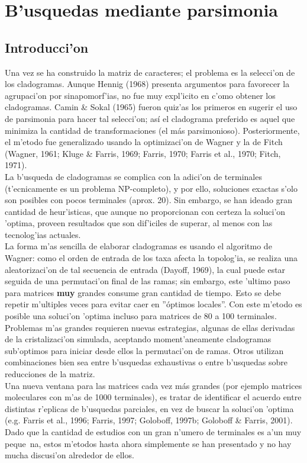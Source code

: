 \chapter{B'usquedas mediante parsimonia}
\section*{Introducci'on}
Una vez se ha construido la matriz de caracteres; el  problema es la selecci'on de los cladogramas. Aunque Hennig (1968) presenta argumentos para favorecer la agrupaci'on por sinapomorf'ias, no fue muy expl'icito en c'omo obtener los cladogramas. Camin \& Sokal (1965) fueron quiz'as los primeros en sugerir el uso de parsimonia para hacer tal selecci'on; as\'i el cladograma preferido es aquel que minimiza la cantidad de transformaciones (el m\'as parsimonioso). Posteriormente, el m'etodo fue generalizado usando la optimizaci'on de Wagner y la de Fitch (Wagner, 1961; Kluge \& Farris, 1969; Farris, 1970; Farris et al., 1970; Fitch, 1971).\\
La b'usqueda de cladogramas se complica con la adici'on de terminales (t'ecnicamente es un problema NP-completo), y por ello, soluciones exactas s'olo son posibles con pocos terminales (aprox. 20). Sin embargo, se han ideado gran cantidad de heur'isticas, que aunque no proporcionan con certeza la soluci'on 'optima, proveen resultados que son dif'iciles de superar, al menos con las tecnolog'ias actuales.\\
La forma m'as sencilla de elaborar cladogramas es usando el algoritmo de Wagner: como el orden de entrada de los taxa afecta la topolog'ia, se realiza una aleatorizaci'on de tal secuencia de entrada (Dayoff, 1969), la cual puede estar seguida de una permutaci'on final de las ramas; sin embargo, este 'ultimo paso para matrices \textbf{muy} grandes consume gran cantidad de tiempo. Esto se debe repetir m'ultiples veces para evitar caer en ''\'optimos locales''. Con este m'etodo es posible una soluci'on 'optima incluso para matrices de 80 a 100 terminales. Problemas m'as grandes requieren nuevas estrategias, algunas de ellas derivadas de la cristalizaci'on simulada, aceptando moment'aneamente cladogramas sub'optimos para iniciar desde ellos la permutaci'on de ramas. Otros utilizan combinaciones bien sea entre b'usquedas exhaustivas o entre b'usquedas sobre reducciones de la matriz.\\
Una nueva ventana para las matrices cada vez m\'as grandes (por ejemplo matrices moleculares con m'as de 1000 terminales), es tratar de identificar el acuerdo entre distintas r'eplicas de b'usquedas parciales, en vez de buscar la soluci'on 'optima (e.g. Farris et al., 1996; Farris, 1997; Goloboff, 1997b; Goloboff \& Farris, 2001). Dado que la cantidad de estudios con un gran n'umero de terminales es a'un muy peque~na, estos m'etodos hasta ahora simplemente se han presentado y no hay mucha discusi'on alrededor de ellos.
